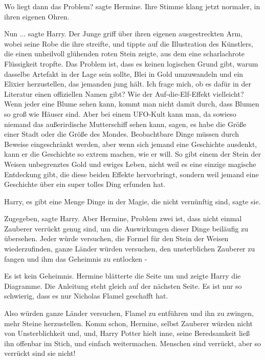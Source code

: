 \glqq Wo liegt dann das Problem?\grqq{} sagte Hermine. Ihre Stimme klang jetzt
normaler, in ihren eigenen Ohren.

\glqq Nun ...\grqq{} sagte Harry. Der Junge griff über ihren eigenen
ausgestreckten Arm, wobei seine Robe die ihre streifte, und tippte auf die
Illustration des Künstlers, die einen unheilvoll glühenden roten Stein zeigte,
aus dem eine scharlachrote Flüssigkeit tropfte. \glqq Das Problem ist, dass es
keinen logischen Grund gibt, warum dasselbe Artefakt in der Lage sein sollte,
Blei in Gold umzuwandeln und ein Elixier herzustellen, das jemanden jung hält.
Ich frage mich, ob es dafür in der Literatur einen offiziellen Namen gibt? Wie
der \glqq Auf-die-Elf-Effekt\grqq{} vielleicht? Wenn jeder eine Blume sehen
kann, kommt man nicht damit durch, dass Blumen so groß wie Häuser sind. Aber bei
einem UFO-Kult kann man, da sowieso niemand das außerirdische Mutterschiff sehen
kann, sagen, es habe die Größe einer Stadt oder die Größe des Mondes.
Beobachtbare Dinge müssen durch Beweise eingeschränkt werden, aber wenn sich
jemand eine Geschichte ausdenkt, kann er die Geschichte so extrem machen, wie er
will. So gibt einem der Stein der Weisen unbegrenztes Gold und ewiges Leben,
nicht weil es eine einzige magische Entdeckung gibt, die diese beiden Effekte
hervorbringt, sondern weil jemand eine Geschichte über ein super tolles Ding
erfunden hat.\grqq{}

\glqq Harry, es gibt eine Menge Dinge in der Magie, die nicht vernünftig
sind\grqq{}, sagte sie.

\glqq Zugegeben\grqq{}, sagte Harry. \glqq Aber Hermine, Problem zwei ist, dass
nicht einmal Zauberer verrückt genug sind, um die Auswirkungen dieser Dinge
beiläufig zu übersehen. Jeder würde versuchen, die Formel für den Stein der
Weisen wiederzufinden, ganze Länder würden versuchen, den unsterblichen Zauberer
zu fangen und ihm das Geheimnis zu entlocken -\grqq{}

\glqq Es ist kein Geheimnis.\grqq{} Hermine blätterte die Seite um und zeigte
Harry die Diagramme. \glqq Die Anleitung steht gleich auf der nächsten Seite. Es
ist nur so schwierig, dass es nur Nicholas Flamel geschafft hat.\grqq{}

\glqq Also würden ganze Länder versuchen, Flamel zu entführen und ihn zu
zwingen, mehr Steine herzustellen. Komm schon, Hermine, selbst Zauberer würden
nicht von Unsterblichkeit und, und\grqq{}, Harry Potter hielt inne, seine
Beredsamkeit ließ ihn offenbar im Stich, \glqq und einfach weitermachen.
Menschen sind verrückt, aber so verrückt sind sie nicht!\grqq{}

